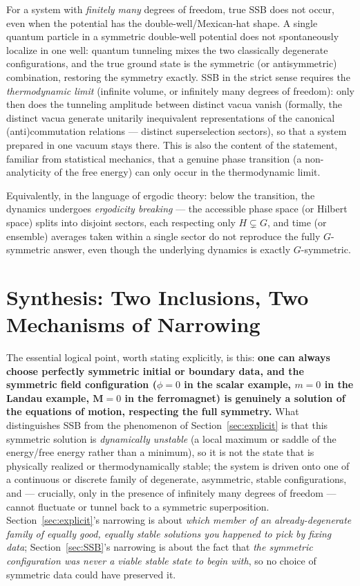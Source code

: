 For a system with \emph{finitely many} degrees of freedom, true SSB does not
occur, even when the potential has the double-well/Mexican-hat shape. A single
quantum particle in a symmetric double-well potential does not spontaneously
localize in one well: quantum tunneling mixes the two classically degenerate
configurations, and the true ground state is the symmetric (or antisymmetric)
combination, restoring the symmetry exactly. SSB in the strict sense requires
the \emph{thermodynamic limit} (infinite volume, or infinitely many degrees of
freedom): only then does the tunneling amplitude between distinct vacua vanish
(formally, the distinct vacua generate unitarily inequivalent representations
of the canonical (anti)commutation relations — distinct superselection
sectors), so that a system prepared in one vacuum stays there. This is also the
content of the statement, familiar from statistical mechanics, that a genuine
phase transition (a non-analyticity of the free energy) can only occur in the
thermodynamic limit.

Equivalently, in the language of ergodic theory: below the transition, the
dynamics undergoes \emph{ergodicity breaking} — the accessible phase space (or
Hilbert space) splits into disjoint sectors, each respecting only $H\subsetneq
G$, and time (or ensemble) averages taken within a single sector do not
reproduce the fully $G$-symmetric answer, even though the underlying dynamics
is exactly $G$-symmetric.

\section{Synthesis: Two Inclusions, Two Mechanisms of Narrowing}
The essential logical point, worth stating explicitly, is this: \textbf{one can
always choose perfectly symmetric initial or boundary data, and the symmetric
field configuration ($\phi=0$ in the scalar example, $m=0$ in the Landau
example, $\bm M=0$ in the ferromagnet) is genuinely a solution of the equations
of motion, respecting the full symmetry.} What distinguishes SSB from the
phenomenon of Section~\ref{sec:explicit} is that this symmetric solution is
\emph{dynamically unstable} (a local maximum or saddle of the energy/free
energy rather than a minimum), so it is not the state that is physically
realized or thermodynamically stable; the system is driven onto one of a
continuous or discrete family of degenerate, asymmetric, stable configurations,
and — crucially, only in the presence of infinitely many degrees of freedom —
cannot fluctuate or tunnel back to a symmetric superposition.
Section~\ref{sec:explicit}'s narrowing is about \emph{which member of an
already-degenerate family of equally good, equally stable solutions you
happened to pick by fixing data}; Section~\ref{sec:SSB}'s narrowing is about
the fact that \emph{the symmetric configuration was never a viable stable state
to begin with}, so no choice of symmetric data could have preserved it.

